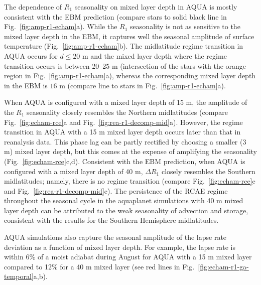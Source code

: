 \documentclass{ametsocV5}
\begin{document}
  The dependence of $R_1$ seasonality on mixed layer depth in AQUA is mostly consistent with the EBM prediction (compare stars to solid black line in Fig.~\ref{fig:amp-r1-echam}a). While the $R_1$ seasonality is not as sensitive to the mixed layer depth in the EBM, it captures well the seasonal amplitude of surface temperature (Fig.~\ref{fig:amp-r1-echam}b). The midlatitude regime transition in AQUA occurs for $d \le 20$ m and the mixed layer depth where the regime transition occurs is between 20--25 m (intersection of the stars with the orange region in Fig.~\ref{fig:amp-r1-echam}a), whereas the corresponding mixed layer depth in the EBM is $16$ m (compare line to stars in Fig.~\ref{fig:amp-r1-echam}a).%

  When AQUA is configured with a mixed layer depth of 15 m, the amplitude of the \(R_{1}\) seasonality closely resembles the Northern midlatitudes (compare Fig.~\ref{fig:echam-rce}a and Fig.~\ref{fig:rea-r1-decomp-mid}a). However, the regime transition in AQUA with a 15 m mixed layer depth occurs later than that in reanalysis data. This phase lag can be partly rectified by choosing a smaller (3 m) mixed layer depth, but this comes at the expense of amplifying the seasonality (Fig.~\ref{fig:echam-rce}c,d). Consistent with the EBM prediction, when AQUA is configured with a mixed layer depth of 40 m, \(\Delta R_{1}\) closely resembles the Southern midlatitudes; namely, there is no regime transition (compare Fig.~\ref{fig:echam-rce}e and Fig.~\ref{fig:rea-r1-decomp-mid}c). The persistence of the RCAE regime throughout the seasonal cycle in the aquaplanet simulations with 40 m mixed layer depth can be attributed to the weak seasonality of advection and storage, consistent with the results for the Southern Hemisphere midlatitudes.

  AQUA simulations also capture the seasonal amplitude of the lapse rate deviation as a function of mixed layer depth. For example, the lapse rate is within 6\% of a moist adiabat during August for AQUA with a 15 m mixed layer compared to 12\% for a 40 m mixed layer (see red lines in Fig.~\ref{fig:echam-r1-ga-temporal}a,b).
  
  
\end{document}
